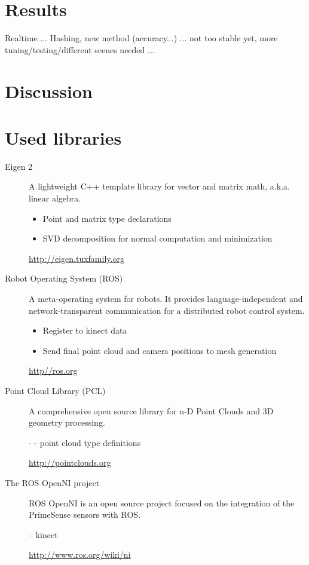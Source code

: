 \documentclass[10pt,twocolumn,letterpaper]{article}
\begin{document}
\section{Results}
Realtime ... Hashing, new method (accuracy...) ... not too stable yet, more tuning/testing/different scenes needed ...

\section{Discussion}

\section{Used libraries}
\label{libraries}
\begin{description}
\item[Eigen 2]
A lightweight C++ template library for vector and matrix math,
a.k.a. linear algebra.

\begin{itemize}
\item Point and matrix type declarations
\item SVD decomposition for normal computation and minimization
\end{itemize}

\href{http://eigen.tuxfamily.org}{http://eigen.tuxfamily.org}

\item[Robot Operating System (ROS)]
A meta-operating system for robots. It provides
language-independent and network-transparent communication for a
distributed robot control system.

\begin{itemize}
\item Register to kinect data
\item Send final point cloud and camera positions to mesh generation
\end{itemize}

\href{http://ros.org}{http//ros.org}

\item[Point Cloud Library (PCL)]
A comprehensive open source library for n-D Point Clouds and 3D geometry processing.

- - point cloud type definitions

\href{http://pointclouds.org}{http://pointclouds.org}

\item[The ROS OpenNI project]
ROS OpenNI is an open source project focused on the integration of the PrimeSense sensors with ROS.

-- kinect

\href{http://www.ros.org/wiki/ni}{http://www.ros.org/wiki/ni}

\end{description}
\end{document}
